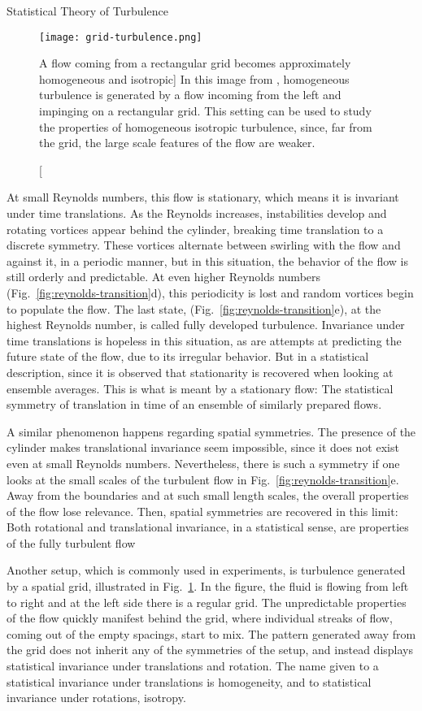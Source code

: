 \begin{chapter}{Statistical Theory of Turbulence}
\begin{figure}[t]
    \centering
    \texttt{[image: grid-turbulence.png]}
    \caption
    [A flow coming from a rectangular grid becomes approximately
    homogeneous and isotropic]
    {In this image from \textcite{van1982album},
    homogeneous turbulence is generated by a flow incoming from
    the left and impinging on a rectangular grid.
    This setting can be used to study the properties
    of homogeneous isotropic turbulence, since, far from
    the grid, the large scale features of the flow
    are weaker.}
    \label{fig:grid-turbulence}
\end{figure}

At small Reynolds numbers, this flow is stationary, which means it
is invariant under time translations.
As the Reynolds increases,
instabilities develop and rotating vortices appear behind
the cylinder, breaking time translation to a discrete symmetry.
These vortices alternate between swirling with the flow and against it,
in a periodic manner, but in this situation, the behavior of the flow
is still orderly and predictable. At even higher Reynolds
numbers (Fig.~\ref{fig:reynolds-transition}d), this periodicity
is lost and random vortices begin to populate the flow.
The last state, (Fig.~\ref{fig:reynolds-transition}e), at the highest Reynolds number,
is called fully developed turbulence.
Invariance under time translations is hopeless in this situation,
as are attempts at predicting the future state of the flow, due
to its irregular behavior. But in a statistical description,
since it is observed that stationarity is recovered when looking at
ensemble averages. This is what is meant by a stationary flow:
The statistical symmetry of translation in time of an ensemble of similarly prepared flows.

A similar phenomenon happens regarding spatial symmetries.
The presence of the cylinder makes translational invariance seem impossible,
since it does not exist even at small Reynolds numbers.
Nevertheless, there is such a symmetry if one looks at the small scales of the
turbulent flow in Fig.~\ref{fig:reynolds-transition}e.
Away from the boundaries and at such small length scales, the
overall properties of the flow lose relevance.
Then, spatial symmetries are recovered in this limit:
Both rotational and translational invariance, in a statistical sense, are properties of the fully turbulent flow

Another setup, which is commonly used in experiments,
is turbulence generated by a spatial grid, illustrated
in Fig.~\ref{fig:grid-turbulence}.
In the figure, the fluid is flowing from left to right
and at the left side there is a regular grid. The unpredictable
properties of the flow quickly manifest behind the grid, where
individual streaks of flow, coming out of the empty spacings, start
to mix. The pattern generated away from the grid does not inherit
any of the symmetries of the setup, and instead displays statistical invariance
under translations and rotation.
The name given to a statistical invariance under translations is
homogeneity, and to statistical invariance under rotations, isotropy.


\end{chapter}
